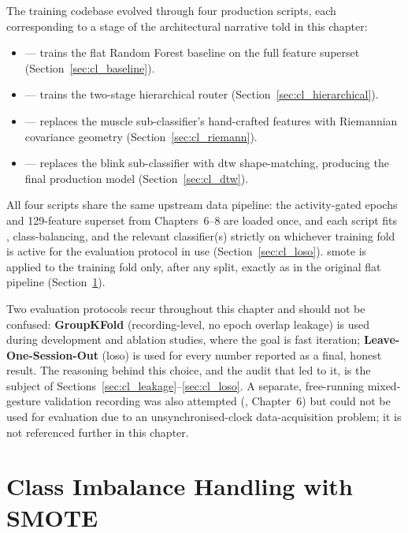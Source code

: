 The training codebase evolved through four production scripts,
each corresponding to a stage of the architectural narrative told
in this chapter:

\begin{itemize}[leftmargin=*]
    \item {} --- trains the flat Random Forest
    baseline on the full feature superset (Section~\ref{sec:cl_baseline}).
    \item {} --- trains the two-stage
    hierarchical router (Section~\ref{sec:cl_hierarchical}).
    \item {} --- replaces the muscle
    sub-classifier's hand-crafted features with Riemannian
    covariance geometry (Section~\ref{sec:cl_riemann}).
    \item {} --- replaces the blink
    sub-classifier with \acrshort{dtw} shape-matching, producing the
    final production model (Section~\ref{sec:cl_dtw}).
\end{itemize}

All four scripts share the same upstream data pipeline: the
activity-gated epochs and 129-feature superset from Chapters~6--8
are loaded once, and each script fits ,
class-balancing, and the relevant classifier(s) strictly on
whichever training fold is active for the evaluation protocol in
use (Section~\ref{sec:cl_loso}). \acrshort{smote} is applied to the
training fold only, after any split, exactly as in the original
flat pipeline (Section~\ref{sec:cl_imbalance}).

Two evaluation protocols recur throughout this chapter and should
not be confused: \textbf{GroupKFold} (recording-level, no epoch
overlap leakage) is used during development and ablation studies,
where the goal is fast iteration; \textbf{Leave-One-Session-Out}
(\acrshort{loso}) is used for every number reported as a final,
honest result. The reasoning behind this choice, and the audit
that led to it, is the subject of
Sections~\ref{sec:cl_leakage}--\ref{sec:cl_loso}. A separate,
free-running mixed-gesture validation recording was also attempted
(, Chapter~6) but could not be used for evaluation
due to an unsynchronised-clock data-acquisition problem; it is not
referenced further in this chapter.

\section{Class Imbalance Handling with SMOTE}
\label{sec:cl_imbalance}

